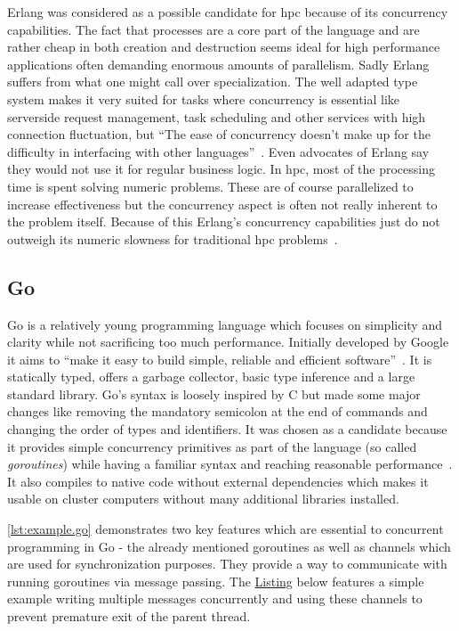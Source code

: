 Erlang was considered as a possible candidate for \gls{hpc} because of its concurrency capabilities. The fact that processes are a core part of the language and are rather cheap in both creation and destruction seems ideal for high performance applications often demanding enormous amounts of parallelism. Sadly Erlang suffers from what one might call over specialization. The well adapted type system makes it very suited for tasks where concurrency is essential like serverside request management, task scheduling and other services with high connection fluctuation, but ``The ease of concurrency doesn’t make up for the difficulty in interfacing with other languages''~\cite{erlang_fps}. Even advocates of Erlang say they would not use it for regular business logic. In \gls{hpc},  most of the processing time is spent solving numeric problems. These are of course parallelized to increase effectiveness but the concurrency aspect is often not really inherent to the problem itself. Because of this Erlang's concurrency capabilities just do not outweigh its numeric slowness for traditional \gls{hpc} problems~\cite{erlang_guide}.

\subsection*{Go}
\label{subsec:State_of_the_art::Candidates::Go}

Go is a relatively young programming language which focuses on simplicity and clarity while not sacrificing too much performance. Initially developed by Google it aims to ``make it easy to build simple, reliable and efficient software''~\cite{go_home}. It is statically typed, offers a garbage collector, basic type inference and a large standard library. Go's syntax is loosely inspired by C but made some major changes like removing the mandatory semicolon at the end of commands and changing the order of types and identifiers. It was chosen as a candidate because it provides simple concurrency primitives as part of the language (so called \textit{\glspl{goroutine}}) while having a familiar syntax and reaching reasonable performance~\cite{intro_go}. It also compiles to native code without external dependencies which makes it usable on cluster computers without many additional libraries installed.

\autoref{lst:example.go} demonstrates two key features which are essential to concurrent programming in Go - the already mentioned \glspl{goroutine} as well as channels which are used for synchronization purposes. They provide a way to communicate with running \glspl{goroutine} via message passing. The \hyperref[lst:example.go]{Listing} below features a simple example writing multiple messages concurrently and using these channels to prevent premature exit of the parent thread.
\newpage


